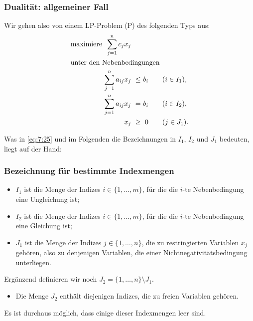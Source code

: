 \documentclass[smaller]{beamer}
\begin{document}
\begin{frame}
 \frametitle{Dualität: allgemeiner Fall}
 Wir gehen also von einem LP-Problem (P) des folgenden Typs aus:
\begin{align}
\begin{alignedat}{4}
\label{eq:7:25}
& \text{maximiere } & \sum\limits_{j=1}^{n}{c_jx_j} & & & \\
& \rlap{unter den Nebenbedingungen} & & & & \\
&& \sum\limits_{j=1}^{n}{a_{ij}x_j} &\ \leq &\ b_i & \qquad (i \in I_1), \\
&& \sum\limits_{j=1}^{n}{a_{ij}x_j} &\    = &\ b_i & \qquad (i \in I_2), \\
&&                              x_j &\ \geq &\   0 & \qquad (j \in J_1).
\end{alignedat}
\end{align}

Was in \eqref{eq:7:25} und im Folgenden die Bezeichnungen in $I_1$, $I_2$ und $J_1$ bedeuten, liegt auf der Hand:
\end{frame}

\begin{frame}
 \frametitle{Bezeichnung für bestimmte Indexmengen}
 \begin{itemize}
\item $I_1$ ist die Menge der Indizes $i \in \bigl\{ 1,\ldots,m \bigr\}$, für die die $i$-te Nebenbedingung eine \alert{Ungleichung} ist;
\item $I_2$ ist die Menge der Indizes $i \in \bigl\{ 1,\ldots,m \bigr\}$, für die die $i$-te Nebenbedingung eine \alert{Gleichung} ist;
\item $J_1$ ist die Menge der Indizes $j \in \bigl\{ 1,\ldots,n \bigr\}$, die zu \alert{restringierten Variablen} $x_j$ gehören, also zu denjenigen Variablen, die einer Nichtnegativitätsbedingung unterliegen.
\end{itemize}

Ergänzend definieren wir noch $J_2 = \bigl\{ 1,\ldots,n \bigr\} \setminus J_1$.
\begin{itemize}
\item Die Menge $J_2$ enthält diejenigen Indizes, die zu \alert{freien Variablen} gehören.
\end{itemize}

Es ist durchaus möglich, dass einige dieser Indexmengen leer sind.
\end{frame}
\end{document}

